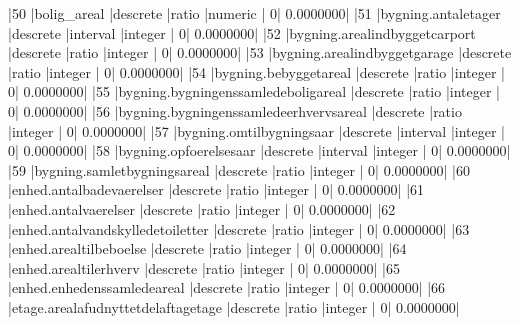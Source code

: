 \documentclass{report}
\begin{document}
\begin{Schunk}
\begin{Soutput}
|50  |bolig_areal                                                   |descrete           |ratio          |numeric         |              0|          0.0000000|
|51  |bygning.antaletager                                           |descrete           |interval       |integer         |              0|          0.0000000|
|52  |bygning.arealindbyggetcarport                                 |descrete           |ratio          |integer         |              0|          0.0000000|
|53  |bygning.arealindbyggetgarage                                  |descrete           |ratio          |integer         |              0|          0.0000000|
|54  |bygning.bebyggetareal                                         |descrete           |ratio          |integer         |              0|          0.0000000|
|55  |bygning.bygningenssamledeboligareal                           |descrete           |ratio          |integer         |              0|          0.0000000|
|56  |bygning.bygningenssamledeerhvervsareal                        |descrete           |ratio          |integer         |              0|          0.0000000|
|57  |bygning.omtilbygningsaar                                      |descrete           |interval       |integer         |              0|          0.0000000|
|58  |bygning.opfoerelsesaar                                        |descrete           |interval       |integer         |              0|          0.0000000|
|59  |bygning.samletbygningsareal                                   |descrete           |ratio          |integer         |              0|          0.0000000|
|60  |enhed.antalbadevaerelser                                      |descrete           |ratio          |integer         |              0|          0.0000000|
|61  |enhed.antalvaerelser                                          |descrete           |ratio          |integer         |              0|          0.0000000|
|62  |enhed.antalvandskylledetoiletter                              |descrete           |ratio          |integer         |              0|          0.0000000|
|63  |enhed.arealtilbeboelse                                        |descrete           |ratio          |integer         |              0|          0.0000000|
|64  |enhed.arealtilerhverv                                         |descrete           |ratio          |integer         |              0|          0.0000000|
|65  |enhed.enhedenssamledeareal                                    |descrete           |ratio          |integer         |              0|          0.0000000|
|66  |etage.arealafudnyttetdelaftagetage                            |descrete           |ratio          |integer         |              0|          0.0000000|

\end{Soutput}
\end{Schunk}
\end{document}

